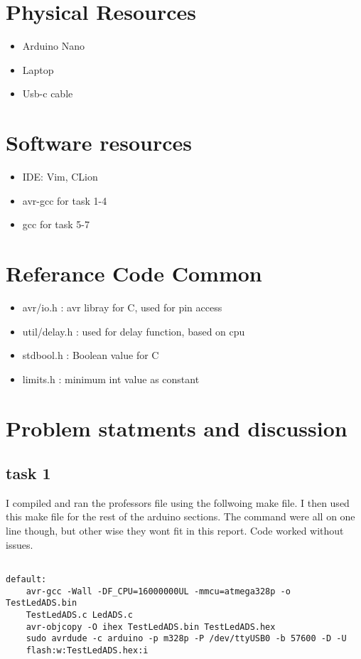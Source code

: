 \section{Physical Resources}
\begin{itemize}
	\item 
		Arduino Nano
	\item
		Laptop
	\item
		Usb-c cable
\end{itemize}

\section{Software resources}
\begin{itemize}
	\item 
		IDE: Vim, CLion
	\item
		avr-gcc for task 1-4
	\item
		gcc for task 5-7
	\end{itemize}

	\section{Referance Code Common}
	\begin{itemize}
		\item avr/io.h : avr libray for C, used for pin access
		\item util/delay.h : used for delay function, based on cpu  
		\item stdbool.h : Boolean value for C
		\item limits.h : minimum int value as constant
	\end{itemize}

	\section{Problem statments and discussion}
	\subsection{task 1}
	I compiled and ran the professors file using the follwoing make file. I then used this make file for the rest of the arduino sections. The command were all on one line though, but other wise they wont fit in this report. Code worked without issues.


\begin{lstlisting}
    
default:
	avr-gcc -Wall -DF_CPU=16000000UL -mmcu=atmega328p -o TestLedADS.bin 
	TestLedADS.c LedADS.c
	avr-objcopy -O ihex TestLedADS.bin TestLedADS.hex
	sudo avrdude -c arduino -p m328p -P /dev/ttyUSB0 -b 57600 -D -U 
	flash:w:TestLedADS.hex:i

\end{lstlisting}
